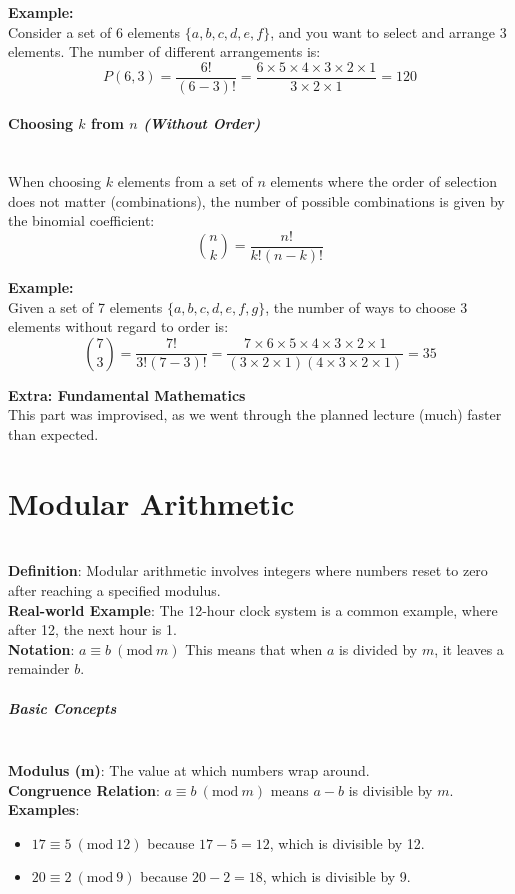 \documentclass[]{article}
\begin{document}
	\textbf{Example:}
	\noindent\\
	Consider a set of 6 elements $\{a, b, c, d, e, f\}$, and you want to select and arrange 3 elements. The number of different arrangements is:
	$$
	P(6, 3)
	= \frac{6!}{(6-3)!}
	= \frac{6 \times 5 \times 4 \times 3 \times 2 \times 1}{3 \times 2 \times 1}
	= 120
	$$
	
	\paragraph{Choosing $k$ from $n$ \textit{(Without Order)}}
	\noindent\\
	When choosing $k$ elements from a set of $n$ elements where the order of selection does not matter (combinations), the number of possible combinations is given by the binomial coefficient:
	$$
	\binom{n}{k} = \frac{n!}{k!(n-k)!}
	$$
	
	\textbf{Example:}
	\noindent\\
	Given a set of 7 elements $\{a, b, c, d, e, f, g\}$, the number of ways to choose 3 elements without regard to order is:
	$$
	\binom{7}{3}
	= \frac{7!}{3!(7-3)!}
	= \frac{7 \times 6 \times 5 \times 4 \times 3 \times 2 \times 1}{(3 \times 2 \times 1)(4 \times 3 \times 2 \times 1)}
	= 35
	$$
	
	\newpage
	\textbf{{\LARGE Extra: Fundamental Mathematics}}\\
	This part was improvised, as we went through the planned lecture (much) faster than expected.
	
	\section*{Modular Arithmetic}
	\noindent \\
	\textbf{Definition}: Modular arithmetic involves integers where numbers reset to zero after reaching a specified modulus.
	\noindent \\
	\textbf{Real-world Example}: The 12-hour clock system is a common example, where after 12, the next hour is 1.
	\noindent \\
	\textbf{Notation}: $a \equiv b \ (\text{mod} \ m)$
	This means that when $a$ is divided by $m$, it leaves a remainder $b$.

	
	\subparagraph{Basic Concepts}
	\noindent \\
	\textbf{Modulus (m)}: The value at which numbers wrap around.
	\noindent \\
	\textbf{Congruence Relation}: $a \equiv b \ (\text{mod} \ m)$ means $a - b$ is divisible by $m$.
	\noindent \\
	\textbf{Examples}:
	\begin{itemize}
		\item $17 \equiv 5 \ (\text{mod} \ 12)$ because $17 - 5 = 12$, which is divisible by 12.
		\item $20 \equiv 2 \ (\text{mod} \ 9)$ because $20 - 2 = 18$, which is divisible by 9.
	\end{itemize}
\end{document}
